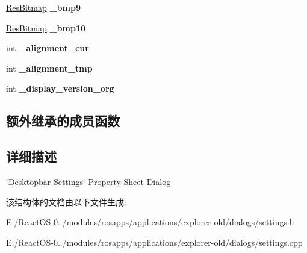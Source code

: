 \begin{DoxyCompactItemize}
\item 
\mbox{\label{struct_desktop_settings_dlg_ad4fee25a9daf2c3d9ec735036e967d9a}} 
\hyperlink{struct_res_bitmap}{Res\+Bitmap} {\bfseries \+\_\+bmp9}
\item 
\mbox{\label{struct_desktop_settings_dlg_a7f22665c151d0fa1d1737e84259d6336}} 
\hyperlink{struct_res_bitmap}{Res\+Bitmap} {\bfseries \+\_\+bmp10}
\item 
\mbox{\label{struct_desktop_settings_dlg_a265dd92c3564125e2600f3b0fc7382c7}} 
int {\bfseries \+\_\+alignment\+\_\+cur}
\item 
\mbox{\label{struct_desktop_settings_dlg_a3c1e1c7ae28f6a279732718d4b358656}} 
int {\bfseries \+\_\+alignment\+\_\+tmp}
\item 
\mbox{\label{struct_desktop_settings_dlg_a54492783b525dc45b1c613b65135afd3}} 
int {\bfseries \+\_\+display\+\_\+version\+\_\+org}
\end{DoxyCompactItemize}
\subsection*{额外继承的成员函数}


\subsection{详细描述}
\char`\"{}\+Desktopbar Settings\char`\"{} \hyperlink{struct_property}{Property} Sheet \hyperlink{struct_dialog}{Dialog} 

该结构体的文档由以下文件生成\+:\begin{DoxyCompactItemize}
\item 
E\+:/\+React\+O\+S-\/0../modules/rosapps/applications/explorer-\/old/dialogs/settings.\+h\item 
E\+:/\+React\+O\+S-\/0../modules/rosapps/applications/explorer-\/old/dialogs/settings.\+cpp\end{DoxyCompactItemize}
